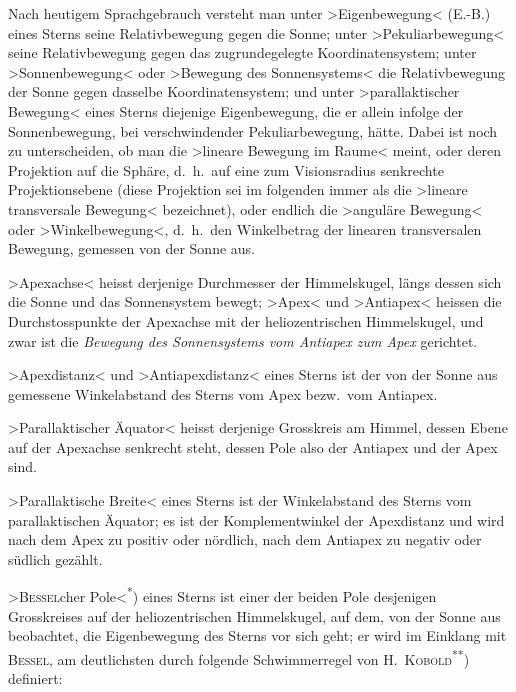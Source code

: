 \documentclass[12pt,a4paper]{article}
\theoremstyle{plain}
\theoremstyle{definition}
\theoremstyle{remark}
\begin{document}
\begin{small}
Nach heutigem Sprachgebrauch versteht man unter \textgreater{}Eigenbewegung\textless{}
(E.-B.) eines Sterns seine Relativbewegung gegen die Sonne; unter
\textgreater{}Pekuliarbewegung\textless{} seine Relativbewegung gegen das zugrundegelegte
Koordinatensystem; unter \textgreater{}Sonnenbewegung\textless{} oder \textgreater{}Bewegung des
Sonnensystems\textless{} die Relativbewegung der Sonne gegen dasselbe Koordinatensystem;
und unter \textgreater{}parallaktischer Bewegung\textless{} eines Sterns diejenige
Eigenbewegung, die er allein infolge der Sonnenbewegung, bei verschwindender
Pekuliarbewegung, h\"atte. Dabei ist noch zu unterscheiden, ob man die
\textgreater{}lineare Bewegung im Raume\textless{} meint, oder deren Projektion auf die Sph\"are,
d.~h.~auf eine zum Visionsradius senkrechte Projektionsebene (diese Projektion
sei im folgenden immer als die \textgreater{}lineare transversale Bewegung\textless{} bezeichnet),
oder endlich die \textgreater{}angul\"are Bewegung\textless{} oder \textgreater{}Winkelbewegung\textless{},
d.~h.~den Winkelbetrag der linearen transversalen Bewegung, gemessen von der
Sonne aus.

\textgreater{}Apexachse\textless{} heisst derjenige Durchmesser der Himmelskugel, l\"angs dessen
sich die Sonne und das Sonnensystem bewegt; \textgreater{}Apex\textless{} und \textgreater{}Antiapex\textless{}
heissen die Durchstosspunkte der Apexachse mit der heliozentrischen Himmelskugel,
und zwar ist die \textit{Bewegung des Sonnensystems vom Antiapex zum Apex} gerichtet.

\textgreater{}Apexdistanz\textless{} und \textgreater{}Antiapexdistanz\textless{} eines Sterns ist der von der
Sonne aus gemessene Winkelabstand des Sterns vom Apex bezw.~vom Antiapex.

\textgreater{}Parallaktischer \"Aquator\textless{} heisst derjenige Grosskreis am Himmel, dessen
Ebene auf der Apexachse senkrecht steht, dessen Pole also der Antiapex und
der Apex sind.

\textgreater{}Parallaktische Breite\textless{} eines Sterns ist der Winkelabstand des Sterns vom
parallaktischen \"Aquator; es ist der Komplementwinkel der Apexdistanz und wird
nach dem Apex zu positiv oder n\"ordlich, nach dem Antiapex zu negativ oder
s\"udlich gez\"ahlt.

\textgreater{}\textsc{Bessel}cher Pole\textless{}\textsuperscript{*}) eines Sterns ist einer der beiden Pole desjenigen
Grosskreises auf der heliozentrischen Himmelskugel, auf dem, von der Sonne aus
beobachtet, die Eigenbewegung des Sterns vor sich geht; er wird im Einklang
mit \textsc{Bessel}, am deutlichsten durch folgende Schwimmerregel von \textsc{H.~Kobold}\textsuperscript{**})
definiert:
\begin{center}
\end{center}


\end{small}
\end{document}
